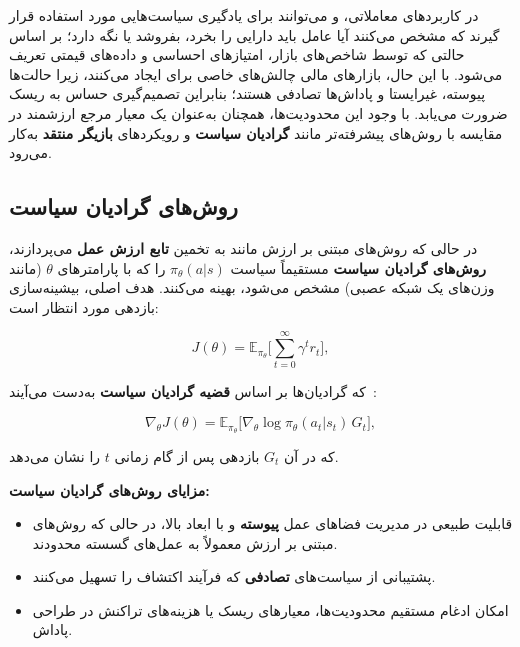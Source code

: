 \documentclass[12pt, a4paper]{report}
\begin{document}
\bigskip

در کاربردهای معاملاتی،  و  می‌توانند برای یادگیری سیاست‌هایی مورد استفاده قرار گیرند که مشخص می‌کنند آیا عامل باید دارایی را بخرد، بفروشد یا نگه دارد؛ بر اساس حالتی که توسط شاخص‌های بازار، امتیازهای احساسی و داده‌های قیمتی تعریف می‌شود. با این حال، بازارهای مالی چالش‌های خاصی برای   ایجاد می‌کنند، زیرا حالت‌ها پیوسته، غیرایستا و پاداش‌ها تصادفی هستند؛ بنابراین تصمیم‌گیری حساس به ریسک ضرورت می‌یابد. با وجود این محدودیت‌ها،   همچنان به‌عنوان یک معیار مرجع ارزشمند در مقایسه با روش‌های پیشرفته‌تر مانند \textbf{گرادیان سیاست} و رویکردهای \textbf{بازیگر \lr{-} منتقد} به‌کار می‌رود.  


\subsection{روش‌های گرادیان سیاست\protect\footnotemark}

در حالی که روش‌های مبتنی بر ارزش مانند  به تخمین \textbf{تابع ارزش عمل} می‌پردازند، \textbf{روش‌های گرادیان سیاست} مستقیماً سیاست $\pi_{\theta}(a|s)$ را که با پارامترهای $\theta$ (مانند وزن‌های یک شبکه عصبی) مشخص می‌شود، بهینه می‌کنند. هدف اصلی، بیشینه‌سازی بازدهی مورد انتظار است:

\[
J(\theta) = \mathbb{E}_{\pi_\theta}\bigg[ \sum_{t=0}^\infty \gamma^t r_t \bigg],
\]

که گرادیان‌ها بر اساس \textbf{قضیه گرادیان سیاست} به‌دست می‌آیند~\cite{sutton1999policy}:

\[
\nabla_\theta J(\theta) = \mathbb{E}_{\pi_\theta}\big[ \nabla_\theta \log \pi_\theta(a_t|s_t) \, G_t \big],
\]

که در آن $G_t$ بازدهی پس از گام زمانی $t$ را نشان می‌دهد.  

\bigskip

\textbf{مزایای روش‌های گرادیان سیاست:}
\begin{itemize}
    \item قابلیت طبیعی در مدیریت فضاهای عمل \textbf{پیوسته} و با ابعاد بالا، در حالی که روش‌های مبتنی بر ارزش معمولاً به عمل‌های گسسته محدودند.
    \item پشتیبانی از سیاست‌های \textbf{تصادفی} که فرآیند اکتشاف را تسهیل می‌کنند.
    \item امکان ادغام مستقیم محدودیت‌ها، معیارهای ریسک یا هزینه‌های تراکنش در طراحی پاداش.
\end{itemize}
\end{document}
